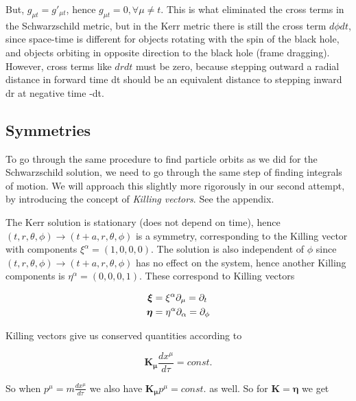 \documentclass{article}
\begin{document}
But, $g_{\mu t} = g'_{\mu t}$, hence $g_{\mu t}=0, \forall \mu \neq t$. This is what eliminated the cross terms in the Schwarzschild metric, but in the Kerr metric there is still the cross term $d\phi dt$, since space-time is different for objects rotating with the spin of the black hole, and objects orbiting in opposite direction to the black hole (frame dragging). However, cross terms like $dr dt$ must be zero, because stepping outward a radial distance in forward time dt should be an equivalent distance to stepping inward dr at negative time -dt. 


\subsection{Symmetries}

To go through the same procedure to find particle orbits as we did for the Schwarzschild solution, we need to go through the same step of finding integrals of motion. We will approach this slightly more rigorously in our second attempt, by introducing the concept of \textit{Killing vectors}. See the appendix.

The Kerr solution is stationary (does not depend on time), hence $(t,r,\theta,\phi)\rightarrow(t+a,r,\theta,\phi)$ is a symmetry, corresponding to the Killing vector with components $\xi^{\alpha}=(1,0,0,0)$. The solution is also independent of $\phi$ since $(t,r,\theta,\phi)\rightarrow(t+a,r,\theta,\phi)$ has no effect on the system, hence another Killing components is $\eta^{\alpha}=(0,0,0,1)$. These correspond to Killing vectors 


\begin{alignat}{2}
    \boldsymbol{\xi}&=\xi^{\alpha}\partial_{\mu}=\partial_t\notag\\
    \boldsymbol{\eta}&=\eta^{\alpha}\partial_{\alpha}=\partial_{\phi}\notag
\end{alignat}

Killing vectors give us conserved quantities according to 

\begin{equation}
    \boldsymbol{K_\mu} \frac{dx^\mu}{d\tau} = const.
\end{equation}

So when $p^\mu=m\frac{dx^\mu}{d\tau}$ we also have $\boldsymbol{K_\mu} p^\mu = const.$ as well. So for $\boldsymbol{K}=\boldsymbol{\eta}$ we get 
\end{document}
